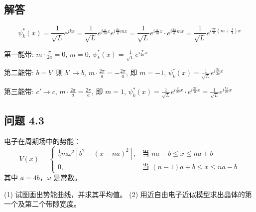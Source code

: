 \documentclass[12pt, a4paper]{article}
\begin{document}
\subsection*{解答}
\[
\psi_k^*(x) = \frac{1}{\sqrt{L}} e^{jkx} = \frac{1}{\sqrt{L}} e^{j\frac{\pi}{2a}x} e^{i\frac{2\pi}{a}mx} = \frac{1}{\sqrt{L}} e^{i\frac{\pi}{2a}x} \cdot e^{i\frac{2\pi}{a}mx} =  \frac{1}{\sqrt{L}} e^{i\frac{2\pi}{a}(m+\frac{1}{4})x}
\]

第一能带: \(m \cdot \frac{\pi}{2a} = 0\), \(m = 0\), \(\psi_k^*(x) = \frac{1}{\sqrt{L}} e^{i\frac{\pi}{2a}x}\)

第二能带: \(b = b'\) 则 \(b' \rightarrow b\), \(m \cdot \frac{2\pi}{a} = -\frac{2\pi}{a}\), 即 \(m = -1\), \(\psi_k^*(x) = \frac{1}{\sqrt{L}} e^{i\frac{3\pi}{2a}x}\)

第三能带: \(c' \rightarrow c\), \(m \cdot \frac{2\pi}{a} = \frac{2\pi}{a}\), 即 \(m = 1\), \(\psi_k^*(x) = \frac{1}{\sqrt{L}} e^{i\frac{\pi}{2a}x} \cdot e^{i\frac{2\pi}{a}x} = \frac{1}{\sqrt{L}} e^{i\frac{5\pi}{2a}x}\)

\subsection*{问题 4.3}
电子在周期场中的势能：
\[
V(x) =
\begin{cases}
\frac{1}{2}m\omega^2 [b^2 - (x - na)^2], & \text{当 } na - b \leq x \leq na + b \\
0, & \text{当 } (n-1)a + b \leq x \leq na - b
\end{cases}
\]
其中 \(a = 4b\)，\(\omega\) 是常数。

(1) 试图画出势能曲线，并求其平均值。
(2) 用近自由电子近似模型求出晶体的第一个及第二个带隙宽度。
\end{document}
